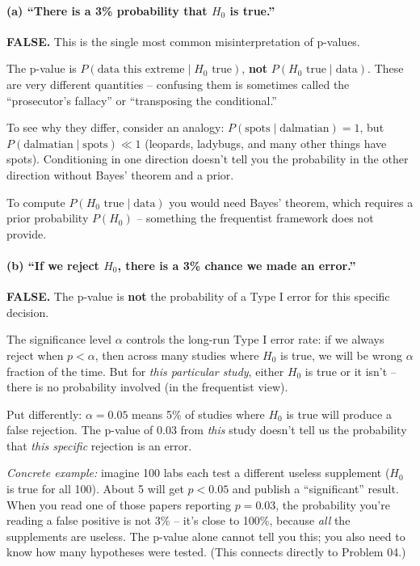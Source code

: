 \documentclass[11pt]{article}
\begin{document}
\paragraph{(a) ``There is a 3\% probability that $H_0$ is true.''}

\textbf{FALSE.} This is the single most common misinterpretation of p-values.

The p-value is $P(\text{data this extreme} \mid H_0 \text{ true})$, \textbf{not} $P(H_0 \text{ true} \mid \text{data})$. These are very different quantities -- confusing them is sometimes called the ``prosecutor's fallacy'' or ``transposing the conditional.''

To see why they differ, consider an analogy: $P(\text{spots} \mid \text{dalmatian}) = 1$, but $P(\text{dalmatian} \mid \text{spots}) \ll 1$ (leopards, ladybugs, and many other things have spots). Conditioning in one direction doesn't tell you the probability in the other direction without Bayes' theorem and a prior.

To compute $P(H_0 \text{ true} \mid \text{data})$ you would need Bayes' theorem, which requires a prior probability $P(H_0)$ -- something the frequentist framework does not provide.

\paragraph{(b) ``If we reject $H_0$, there is a 3\% chance we made an error.''}

\textbf{FALSE.} The p-value is \textbf{not} the probability of a Type I error for this specific decision.

The significance level $\alpha$ controls the long-run Type I error rate: if we always reject when $p < \alpha$, then across many studies where $H_0$ is true, we will be wrong $\alpha$ fraction of the time. But for \textit{this particular study}, either $H_0$ is true or it isn't -- there is no probability involved (in the frequentist view).

Put differently: $\alpha = 0.05$ means 5\% of studies where $H_0$ is true will produce a false rejection. The p-value of 0.03 from \textit{this} study doesn't tell us the probability that \textit{this specific} rejection is an error.

\textit{Concrete example:} imagine 100 labs each test a different useless supplement ($H_0$ is true for all 100). About 5 will get $p < 0.05$ and publish a ``significant'' result. When you read one of those papers reporting $p = 0.03$, the probability you're reading a false positive is not 3\% -- it's close to 100\%, because \textit{all} the supplements are useless. The p-value alone cannot tell you this; you also need to know how many hypotheses were tested. (This connects directly to Problem 04.)
\end{document}
